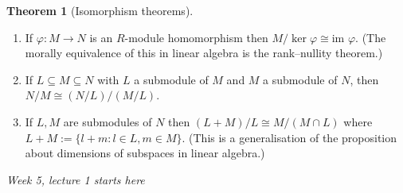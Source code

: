 \documentclass[a4paper]{article}
\newcommand{\im}{\text{im }}
\theoremstyle{definition}
\newtheorem{thm}[defn]{Theorem}
\begin{document}
\begin{thm}[Isomorphism theorems]
\begin{enumerate}
\item If $\varphi:M\rightarrow N$ is an $R$-module homomorphism then $M/\ker\varphi \cong \im \varphi$. (The morally equivalence of this in linear algebra is the rank–nullity theorem.)
\item If $L\subseteq M\subseteq N$ with $L$ a submodule of $M$ and $M$ a submodule of $N$, then $N/M\cong (N/L)/(M/L)$.
\item If $L,M$ are submodules of $N$ then $(L+M)/L\cong M/(M\cap L)$ where $L+M:=\{l+m:l\in L, m\in M\}$. (This is a generalisation of the proposition about dimensions of subspaces in linear algebra.)
\end{enumerate}
\end{thm}

\begin{flushright}
\textit{Week 5, lecture 1 starts here}
\end{flushright}
\end{document}
